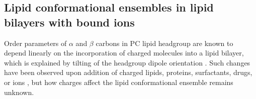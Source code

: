 \documentclass[aps,prl,superscriptaddress,twocolumn]{revtex4}
\begin{document}
\subsection{Lipid conformational ensembles in lipid bilayers with bound ions}
Order parameters of $\alpha$ and $\beta$ carbons in PC lipid headgroup are known to depend
linearly on the incorporation of charged molecules into a lipid bilayer,
which is explained by tilting of the headgroup dipole orientation \cite{??}.
Such changes have been observed upon addition of charged lipids, proteins, surfactants,
drugs, or ions \cite{??}, but how charges affect the lipid conformational ensemble remains unknown.


%
\end{document}
